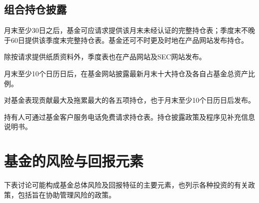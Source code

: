 \documentclass[UTF8,fontset=none,11pt,a4paper]{ctexart}
\begin{document}
\subsection*{组合持仓披露}\label{unitU829}
月末至少30日之后，基金可应请求提供该月末未经认证的完整持仓表；季度末不晚于60日提供该季度末完整持仓表。基金还可不时更及时地在产品网站\allowbreak\mbox{发布持仓。}

除按请求提供纸质资料外，季度表也在产品网站及SEC\allowbreak\mbox{网站发布。}

月末至少10个日历日后，在基金网站披露最新月末十大持仓及各自占基金总资\allowbreak\mbox{产比例。}

对基金表现贡献最大及拖累最大的各五项持仓，也于月末至少10个日历\allowbreak\mbox{日后发布。}

持有人可通过基金客户服务电话免费请求持仓表。持仓披露政策及程序见补充信息\allowbreak\mbox{说明书。}


\par{}\label{originalpage23}
\section*{基金的风险与回报元素}\label{unitU837}
下表讨论可能构成基金总体风险及回报特征的主要元素，也列示各种投资的有关政策，包括旨在协助管理风\allowbreak\mbox{险的政策。}
\end{document}
